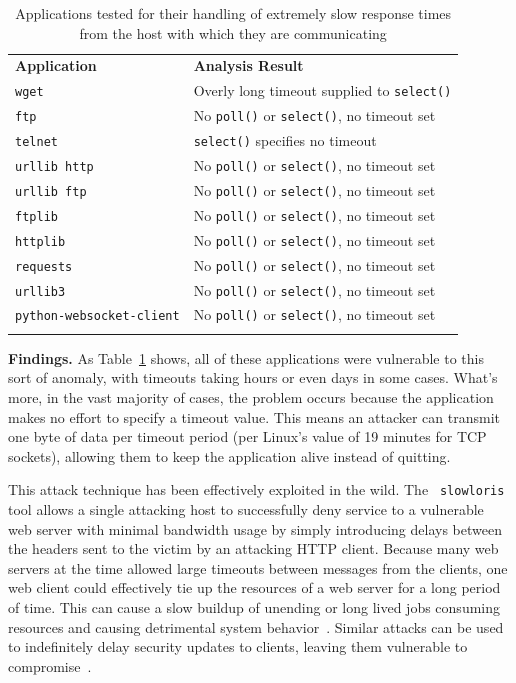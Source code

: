 \begin{table}[t]
  \scriptsize{}
  \begin{tabular}{l | l}
    \toprule{}
    {\bf Application}              & {\bf Analysis Result}\\
    {\tt wget}                     & Overly long timeout supplied to {\tt select()} \\
    {\tt ftp}                      & No {\tt poll()} or {\tt select()}, no timeout set \\
    {\tt telnet}                   & {\tt select()} specifies no timeout \\
    {\tt urllib http}              & No {\tt poll()} or {\tt select()}, no timeout set \\
    {\tt urllib ftp}               & No {\tt poll()} or {\tt select()}, no timeout set \\
    {\tt ftplib}                   & No {\tt poll()} or {\tt select()}, no timeout set \\
    {\tt httplib}                  & No {\tt poll()} or {\tt select()}, no timeout set \\
    {\tt requests}                 & No {\tt poll()} or {\tt select()}, no timeout set \\
    {\tt urllib3}                  & No {\tt poll()} or {\tt select()}, no timeout set \\
    {\tt python-websocket-client}  & No {\tt poll()} or {\tt select()}, no timeout set \\
    \bottomrule{}
  \end{tabular}
  \caption{Applications tested for their handling of extremely slow response
    times from the host with which they are communicating }
  \label{table:slowloris}
\end{table}


{\bf Findings.} As Table~\ref{table:slowloris} shows, all of these
applications were vulnerable to this sort of anomaly, with timeouts taking
hours or even days in some cases.  What's more, in the vast majority of
cases, the problem occurs because the application makes no effort to
specify a timeout value.  This means an attacker can transmit one byte of
data per timeout period (per Linux's value of 19 minutes for TCP sockets),
allowing them to keep the application alive instead of quitting.


This attack technique has been effectively exploited in the wild.  The {\tt
slowloris} tool allows a single attacking host to successfully deny service
to a vulnerable web server with minimal bandwidth usage by simply
introducing delays between the headers sent to the victim by an attacking
HTTP client.  Because many web servers at the time allowed large timeouts
between messages from the clients, one web client could effectively tie up
the resources of a web server for a long period of time.
This can cause a slow buildup of unending or long lived jobs consuming
resources and causing detrimental system behavior~\cite{Slowloris}.
Similar attacks can be used to indefinitely delay security updates to
clients, leaving them vulnerable to compromise~\cite{Cappos_TR_08}.

